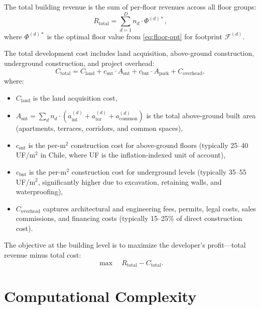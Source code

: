 \documentclass[11pt,a4paper]{article}
\newcommand{\calF}{\mathcal{F}}
\begin{document}
The total building revenue is the sum of per-floor revenues across all
floor groups:
\begin{equation}\label{eq:total-value}
    R_{\text{total}} = \sum_{d=1}^{D} n_d \cdot \Phi^{(d)*},
\end{equation}
where $\Phi^{(d)*}$ is the optimal floor value from \eqref{eq:floor-opt}
for footprint $\calF^{(d)}$.

The total development cost includes land acquisition, above-ground
construction, underground construction, and project overhead:
\begin{equation}
    C_{\text{total}} = C_{\text{land}} + c_{\text{snt}} \cdot A_{\text{snt}} + c_{\text{bnt}} \cdot A_{\text{park}} + C_{\text{overhead}},
\end{equation}
where:
\begin{itemize}[nosep]
    \item $C_{\text{land}}$ is the land acquisition cost,
    \item $A_{\text{snt}} = \sum_d n_d \cdot (a_{\text{int}}^{(d)} + a_{\text{ter}}^{(d)} + a_{\text{common}}^{(d)})$ is the total above-ground built area (apartments, terraces, corridors, and common spaces),
    \item $c_{\text{snt}}$ is the per-m$^2$ construction cost for above-ground floors (typically 25--40 UF/m$^2$ in Chile, where UF is the inflation-indexed unit of account),
    \item $c_{\text{bnt}}$ is the per-m$^2$ construction cost for underground levels (typically 35--55 UF/m$^2$, significantly higher due to excavation, retaining walls, and waterproofing),
    \item $C_{\text{overhead}}$ captures architectural and engineering fees, permits, legal costs, sales commissions, and financing costs (typically 15--25\% of direct construction cost).
\end{itemize}

The objective at the building level is to maximize the developer's
profit---total revenue minus total cost:
\begin{equation}
    \max \quad R_{\text{total}} - C_{\text{total}}.
\end{equation}


\section{Computational Complexity}\label{sec:complexity}
\end{document}
